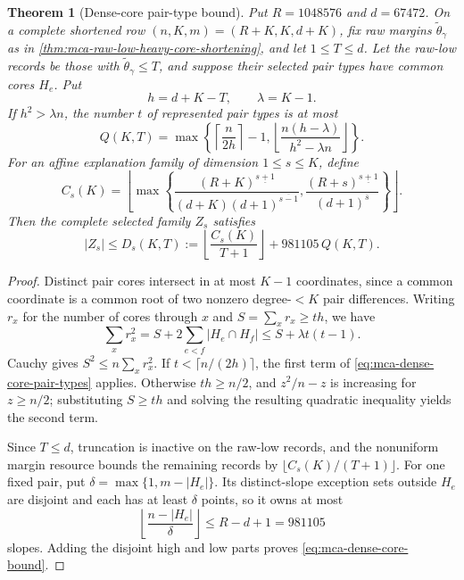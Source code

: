 \documentclass[11pt,a4paper]{amsart}
\numberwithin{equation}{section}
\newtheorem{theorem}{Theorem}[section]
\theoremstyle{remark}
\begin{document}
\begin{theorem}[Dense-core pair-type bound]
\label{thm:mca-dense-core-pair-type}
Put \(R=1048576\) and \(d=67472\).  On a complete shortened row
\((n,K,m)=(R+K,K,d+K)\), fix raw margins
\(\widetilde\theta_\gamma\) as in
\cref{thm:mca-raw-low-heavy-core-shortening}, and let \(1\le T\le d\).
Let the raw-low records be those with
\(\widetilde\theta_\gamma\le T\), and suppose their selected pair types
have common cores \(H_e\).
Put
\[
 h=d+K-T,\qquad \lambda=K-1.
\]
If \(h^2>\lambda n\), the number \(t\) of represented pair types is at most
\[
 Q(K,T)=\max\left\{
 \left\lceil\frac n{2h}\right\rceil-1,
 \left\lfloor\frac{n(h-\lambda)}{h^2-\lambda n}\right\rfloor
 \right\}.
 \tag{DC}\label{eq:mca-dense-core-pair-types}
\]
For an affine explanation family of dimension \(1\le s\le K\), define
\[
 C_s(K)=\left\lfloor\max\left\{
 \frac{(R+K)^{\underline{s+1}}}
      {(d+K)(d+1)^{\overline{s-1}}},
 \frac{(R+s)^{\underline{s+1}}}
      {(d+1)^{\overline s}}
 \right\}\right\rfloor.
\]
Then the complete selected family \(Z_s\) satisfies
\[
 |Z_s|\le
 D_s(K,T):=\left\lfloor\frac{C_s(K)}{T+1}\right\rfloor
       +981105\,Q(K,T).
 \tag{DCB}\label{eq:mca-dense-core-bound}
\]
\end{theorem}

\begin{proof}
Distinct pair cores intersect in at most \(K-1\) coordinates, since a common
coordinate is a common root of two nonzero degree-\(<K\) pair differences.
Writing \(r_x\) for the number of cores through \(x\) and
\(S=\sum_xr_x\ge th\), we have
\[
 \sum_xr_x^2=S+2\sum_{e<f}|H_e\cap H_f|
 \le S+\lambda t(t-1).
\]
Cauchy gives \(S^2\le n\sum_xr_x^2\).  If
\(t<\lceil n/(2h)\rceil\), the first term of
\eqref{eq:mca-dense-core-pair-types} applies.  Otherwise \(th\ge n/2\),
and \(z^2/n-z\) is increasing for \(z\ge n/2\); substituting \(S\ge th\)
and solving the resulting quadratic inequality yields the second term.

Since \(T\le d\), truncation is inactive on the raw-low records, and the
nonuniform margin resource bounds the remaining records by
\(\lfloor C_s(K)/(T+1)\rfloor\).  For one fixed pair, put
\(\delta=\max\{1,m-|H_e|\}\).  Its distinct-slope exception sets outside
\(H_e\) are disjoint and each has at least \(\delta\) points, so it owns at
most
\[
 \left\lfloor\frac{n-|H_e|}{\delta}\right\rfloor\le R-d+1=981105
\]
slopes.  Adding the disjoint high and low parts proves
\eqref{eq:mca-dense-core-bound}.
\end{proof}
\end{document}
